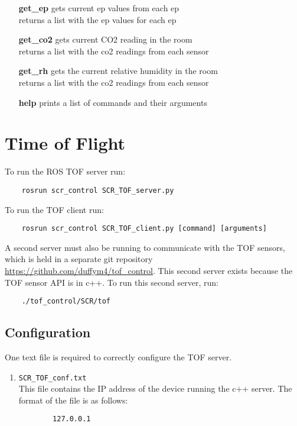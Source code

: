 \documentclass[twoside]{article}
\begin{document}
\begin{enumerate}
		\item[\bf get\_ep] gets current ep values from each ep \\
		returns a list with the ep values for each ep
		
		\item[\bf get\_co2] gets current CO2 reading in the room \\
		returns a list with the co2 readings from each sensor
		
		\item[\bf get\_rh] gets the current relative humidity in the room \\
		returns a list with the co2 readings from each sensor
		
		\item[\bf help] prints a list of commands and their arguments
	\end{enumerate}

	\section{Time of Flight}
	To run the ROS TOF server run:
	\begin{verbatim}
	rosrun scr_control SCR_TOF_server.py
	\end{verbatim}
	To run the TOF client run:
	\begin{verbatim}
	rosrun scr_control SCR_TOF_client.py [command] [arguments]
	\end{verbatim}
	A second server must also be running to communicate with the TOF sensors, which is held in a separate git repository \url{https://github.com/duffym4/tof_control}. This second server exists because the TOF sensor API is in c++. To run this second server, run:
	\begin{verbatim}
	./tof_control/SCR/tof
	\end{verbatim}
	
	\subsection{Configuration}
	One text file is required to correctly configure the TOF server.
	
	\begin{enumerate}
		\item \verb|SCR_TOF_conf.txt|\\
		This file contains the IP address of the device running the c++ server. The format of the file is as follows:
		
		\begin{verbatim}
		127.0.0.1
		\end{verbatim}
		
	\end{enumerate}
	
\end{document}
